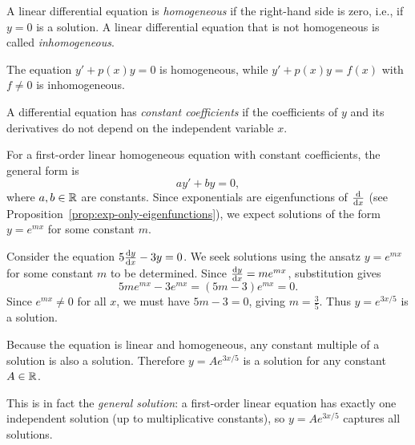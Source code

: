 \documentclass[a4paper]{article}
\begin{document}
\begin{defi}
  A linear differential equation is \emph{homogeneous} if the right-hand side is zero, i.e., if $y = 0$ is a solution. A linear differential equation that is not homogeneous is called \emph{inhomogeneous}.
\end{defi}

\begin{eg}
  The equation $y' + p(x)y = 0$ is homogeneous, while $y' + p(x)y = f(x)$ with $f \neq 0$ is inhomogeneous.
\end{eg}

\begin{defi}
  A differential equation has \emph{constant coefficients} if the coefficients of $y$ and its derivatives do not depend on the independent variable $x$.
\end{defi}

\begin{remark}
  For a first-order linear homogeneous equation with constant coefficients, the general form is
  \[
    ay' + by = 0,
  \]
  where $a, b \in \mathbb{R}$ are constants. Since exponentials are eigenfunctions of $\frac{\mathrm{d}}{\mathrm{d} x}$ (see Proposition~\ref{prop:exp-only-eigenfunctions}), we expect solutions of the form $y = e^{mx}$ for some constant $m$.
\end{remark}

\begin{eg}\label{eg:first-order-homog}
  Consider the equation $5\frac{\mathrm{d} y}{\mathrm{d} x} - 3y = 0$. We seek solutions using the ansatz $y = e^{mx}$ for some constant $m$ to be determined. Since $\frac{\mathrm{d} y}{\mathrm{d} x} = me^{mx}$, substitution gives
  \[
    5me^{mx} - 3e^{mx} = (5m - 3)e^{mx} = 0.
  \]
  Since $e^{mx} \neq 0$ for all $x$, we must have $5m - 3 = 0$, giving $m = \frac{3}{5}$. Thus $y = e^{3x/5}$ is a solution.

  Because the equation is linear and homogeneous, any constant multiple of a solution is also a solution. Therefore $y = Ae^{3x/5}$ is a solution for any constant $A \in \mathbb{R}$.

  This is in fact the \emph{general solution}: a first-order linear equation has exactly one independent solution (up to multiplicative constants), so $y = Ae^{3x/5}$ captures all solutions.
\end{eg}
\end{document}
